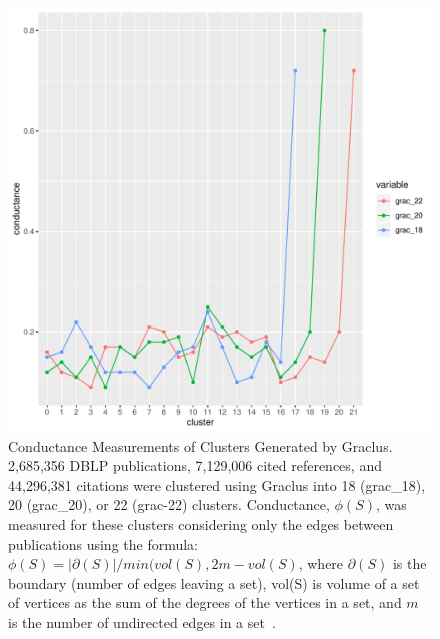 \begin{figure}[ht]
\centering
  \includegraphics[scale=0.4]{graclus_comparison.pdf}
\caption{Conductance Measurements of Clusters Generated by Graclus.  2,685,356 DBLP publications, 7,129,006 cited references, and 44,296,381 citations were clustered using Graclus into 18 (grac\_18), 20 (grac\_20), or 22 (grac-22) clusters. Conductance, $\phi(S)$, was measured for these clusters considering only the edges between publications using the formula: $\phi(S)=|\partial(S)|/min(vol(S),2m-vol(S)$, where $\partial(S)$ is the boundary (number of edges leaving a set), vol(S) is volume of a set of vertices as the sum of the degrees of the vertices in a set, and $m$ is the number of undirected edges in a set~\cite{shun_parallel_2016}.}
\label{fig:graclus_comparison_conductance}       
\end{figure}

\newpage

